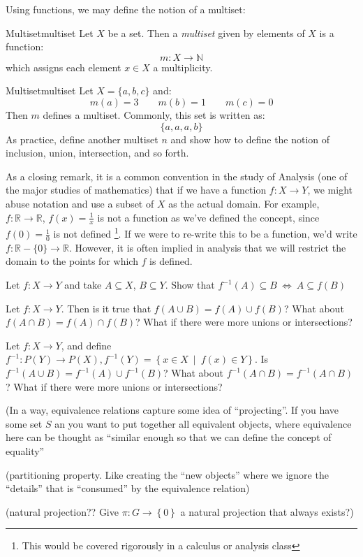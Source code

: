 \documentclass{book}
\newcommand{\N}{{\mathbb{N}}}
\newcommand{\R}{{\mathbb{R}}}
\newcommand{\sse}{\subseteq}
\newcommand{\rw}{\rightarrow}
\newcommand{\LRw}{\Leftrightarrow}
\newcommand{\set}[2]{\left\{#1 \ \middle|\ #2\right\}}
\begin{document}
Using functions, we may define the notion of a multiset:
\begin{defn}{Multiset}{multiset}
	Let $X$ be a set. Then a \emph{multiset} given by elements of $X$ is a function:
	\[
		m: X \to \N
	\]
	which assigns each element $x \in X$ a multiplicity.
\end{defn}

\begin{example}{Multiset}{multiset}
	Let $X = \{a,b,c\}$ and:
	\[
		m(a) = 3 \qquad m(b) = 1 \qquad m(c)  = 0
	\]
	Then $m$ defines a multiset. Commonly, this set is written as:
	\[
		\{a,a,a,b\}
	\]
	As practice, define another multiset $n$ and show how to define the notion of inclusion, union,
	intersection, and so forth.
\end{example}




As a closing remark, it is a common convention in the study of Analysis (one of the major studies of mathematics) that
if we have a function $f: X \rw Y$, we might abuse notation and use a subset of $X$ as the actual domain. For example,
$f: \R \rw \R$, $f(x) = \frac{1}{x}$ is not a function as we've defined the concept, since $f(0) = \frac{1}{0}$ is not
defined \footnote{This would be covered rigorously in a calculus or analysis class}.
If we were to re-write this to be a function, we'd write $f: \R- \{0\} \rw \R$. However, it is often implied in
analysis that we will restrict the domain to the points for which $f$ is defined.

\begin{Exercise}[label=ex:functionsExercises]
\Question Let $f: X \rw Y$ and take $A \sse X$, $B \sse Y$. Show that $f^{-1}(A) \sse B\ \LRw\ A \sse f(B)$

\Question Let $f: X \rw Y$. Then is it true that $f(A\cup B) = f(A) \cup f(B)$? What about $f(A\cap B) = f(A) \cap f(B)$? What if
there were more unions or intersections?

\Question Let $f: X \rw Y$, and define $f^{-1}: P(Y) \rw P(X), f^{-1}(Y) = \set{x \in X}{f(x) \in Y}$. Is $f^{-1}(A\cup B)
= f^{-1}(A)\cup f^{-1}(B)$? What about $f^{-1}(A\cap B) = f^{-1}(A \cap B)$? What if there were more unions or
intersections?

(In a way, equivalence relations capture some idea of ``projecting''. If you have some set $S$ an you want to put
together all equivalent objects, where equivalence here can be thought as ``similar enough so that we can define the
concept of equality''

\Question (partitioning property. Like creating the ``new objects'' where we ignore the ``details'' that is ``consumed'' by the
equivalence relation)

\Question (natural projection?? Give $\pi: G \rw \left\{ 0 \right\}$ a natural projection that always exists?)
\end{Exercise}
\end{document}
